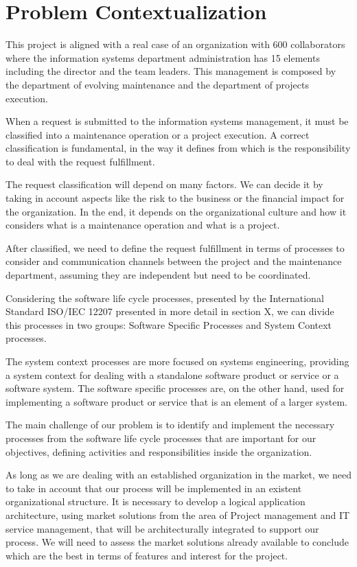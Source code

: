 
% 
% 

\section{Problem Contextualization}

This project is aligned with a real case of an organization with 600 collaborators where the information systems department administration has 15 elements including the director and the team leaders. This management is composed by the department of evolving maintenance and the department of projects execution.\par
When a request is submitted to the information systems management, it must be classified into a maintenance operation or a project execution. A correct classification is fundamental, in the way it defines from which is the responsibility to deal with the request fulfillment.\par
The request classification will depend on many factors. We can decide it by taking in account aspects like the risk to the business or the financial impact for the organization. In the end, it depends on the organizational culture and how it considers what is a maintenance operation and what is a project.\par
After classified, we need to define the request fulfillment in terms of processes to consider and communication channels between the project and the maintenance department, assuming they are independent but need to be coordinated.\par
Considering the software life cycle processes, presented by the International Standard ISO/IEC 12207 presented in more detail in section X, we can divide this processes in two groups: Software Specific Processes and System Context processes.\par
The system context processes are more focused on systems engineering, providing a system context for dealing with a standalone software product or service or a software system. The software specific processes are, on the other hand, used for implementing a software product or service that is an element of a larger system. \par 
The main challenge of our problem is to identify and implement the necessary processes from the software life cycle processes that are important for our objectives, defining activities and responsibilities inside the organization.\par
As long as we are dealing with an established organization in the market, we need to take in account that our process will be implemented in an existent organizational structure. It is necessary to develop a logical application architecture, using market solutions from the area of Project management and IT service management, that will be architecturally integrated to support our process. We will need to assess the market solutions already available to conclude which are the best in terms of features and interest for the project. 
